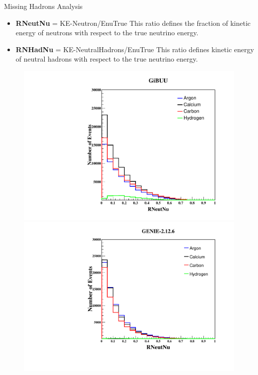 \documentclass[9pt]{beamer}    %
\begin{document}
\begin{frame}{Missing Hadrons Analysis}
 \begin{itemize}
\item \textbf{RNeutNu}  = KE-Neutron/EnuTrue \newline This ratio defines the fraction of kinetic energy of neutrons with respect to the true neutrino energy.
\item \textbf{RNHadNu} = KE-NeutralHadrons/EnuTrue \newline This ratio defines kinetic energy of neutral hadrons with respect to the true neutrino energy.
\end{itemize}

\begin{figure}
\includegraphics[scale=0.23]{Targets_25GeVRNeutNu}
\includegraphics[scale=0.25]{AllTargetRNeutNu}
\end{figure}


\end{frame}
\end{document}
